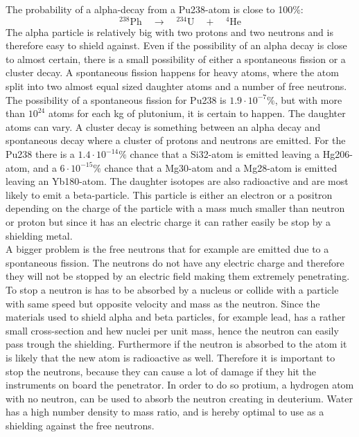 The probability of a alpha-decay from a Pu238-atom is close to 100\%: 
\begin{equation}
^{238}\text{Ph} \quad \rightarrow \quad ^{234}\text{U} \quad + \quad ^4 \text{He}
\end{equation}
The alpha particle is relatively big with two protons and two neutrons and is therefore easy to shield against. Even if the possibility of an alpha decay is close to almost certain, there is a small possibility of either a spontaneous fission or a cluster decay. A spontaneous fission happens for heavy atoms, where the atom split into two almost equal sized daughter atoms and a number of free neutrons. The possibility of a spontaneous fission for Pu238 is $1.9 \cdot 10^{-7}\%$, but with more than $10^{24}$ atoms for each kg of plutonium, it is certain to happen. The daughter atoms can vary. A cluster decay is something between an alpha decay and spontaneous decay where a cluster of protons and neutrons are emitted. For the Pu238 there is a $1.4 \cdot 10^{-14}\%$ chance that a Si32-atom is emitted leaving a Hg206-atom, and a $6 \cdot 10^{-15}\%$ chance that a Mg30-atom and a Mg28-atom is emitted leaving an Yb180-atom. The daughter isotopes are also radioactive and are most likely to emit a beta-particle. This particle is either an electron or a positron depending on the charge of the particle with a mass much smaller than neutron or proton but since it has an electric charge it can rather easily be stop by a shielding metal.\\

\noindent
A bigger problem is the free neutrons that for example are emitted due to a spontaneous fission.  The neutrons do not have any electric charge and therefore they will not be stopped by an electric field making them extremely penetrating. To stop a neutron is has to be absorbed by a nucleus or collide with a particle with same speed but opposite velocity and mass as the neutron. Since the materials used to shield alpha and beta particles, for example lead, has a rather small cross-section and hew nuclei per unit mass, hence the neutron can easily pass trough the shielding. Furthermore if the neutron is absorbed to the atom it is likely that the new atom is radioactive as well. Therefore it is important to stop the neutrons, because they can cause a lot of damage if they hit the instruments on board the penetrator. In order to do so protium, a hydrogen atom with no neutron, can be used to absorb the neutron creating in deuterium. Water has a high number density to mass ratio, and is hereby optimal to use as a shielding against the free neutrons.


